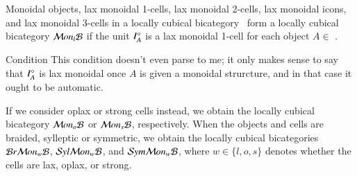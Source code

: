 \begin{thm}\label{thm:lcbc}
  Monoidal objects, lax monoidal 1-cells, lax monoidal 2-cells, lax monoidal icons, and lax monoidal 3-cells in a locally cubical bicategory \fB\ form a locally cubical bicategory $\mathcal{M} on_l\mathcal{B}$ if the unit $I^{\circ}_A$ is a lax monoidal 1-cell for each object $A \in$ \fB.
  \begin{anfxnote}[author=MS]{Condition}
    This condition doesn't even parse to me; it only makes sense to say that $I^{\circ}_A$ is lax monoidal once $A$ is given a monoidal strurcture, and in that case it ought to be automatic.
  \end{anfxnote}
  If we consider oplax or strong cells instead, we obtain the locally cubical bicategory $\mathcal{M} on_o\mathcal{B}$ or $\mathcal{M} on_s\mathcal{B}$, respectively. When the objects and cells are braided, sylleptic or symmetric,  we obtain the locally cubical bicategories $\mathcal{B} r \mathcal{M} on_w\mathcal{B}$, $\mathcal{S} yl \mathcal{M} on_w\mathcal{B}$, and $\mathcal{S} ym \mathcal{M} on_w\mathcal{B}$, where $w \in \{l,o,s\}$ denotes whether the cells are lax, oplax, or strong.
\end{thm}

